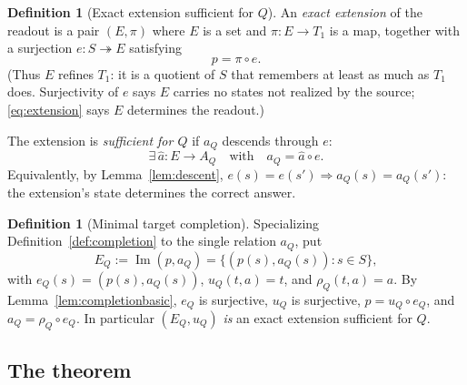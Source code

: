 \documentclass[11pt,reqno]{amsart}
\theoremstyle{plain}
\theoremstyle{definition}
\newtheorem{definition}[theorem]{Definition}
\theoremstyle{remark}
\DeclareMathOperator{\Ima}{Im}
\begin{document}
\begin{definition}[Exact extension sufficient for $Q$]\label{def:sufficient}
An \emph{exact extension} of the readout is a pair $(E,\pi)$ where $E$ is a set and $\pi\colon E\to T_1$ is a map, together with a surjection $e\colon S\twoheadrightarrow E$ satisfying
\begin{equation}\label{eq:extension}
p=\pi\circ e .
\end{equation}
(Thus $E$ refines $T_1$: it is a quotient of $S$ that remembers at least as much as $T_1$ does. Surjectivity of $e$ says $E$ carries no states not realized by the source; \eqref{eq:extension} says $E$ determines the readout.)

The extension is \emph{sufficient for $Q$} if $a_Q$ descends through $e$:
\begin{equation}\label{eq:sufficient}
\exists\,\hat a\colon E\to A_Q\quad\text{with}\quad a_Q=\hat a\circ e .
\end{equation}
Equivalently, by Lemma~\ref{lem:descent}, $e(s)=e(s')\Rightarrow a_Q(s)=a_Q(s')$: the extension's state determines the correct answer.
\end{definition}

\begin{definition}[Minimal target completion]\label{def:EQ}
Specializing Definition~\ref{def:completion} to the single relation $a_Q$, put
\begin{equation}\label{eq:EQ}
E_Q:=\Ima(p,a_Q)=\bigl\{(p(s),a_Q(s)):s\in S\bigr\},
\end{equation}
with $e_Q(s)=(p(s),a_Q(s))$, $u_Q(t,a)=t$, and $\rho_Q(t,a)=a$. By Lemma~\ref{lem:completionbasic}, $e_Q$ is surjective, $u_Q$ is surjective, $p=u_Q\circ e_Q$, and $a_Q=\rho_Q\circ e_Q$. In particular $(E_Q,u_Q)$ \emph{is} an exact extension sufficient for $Q$.
\end{definition}

\subsection{The theorem}
\end{document}
